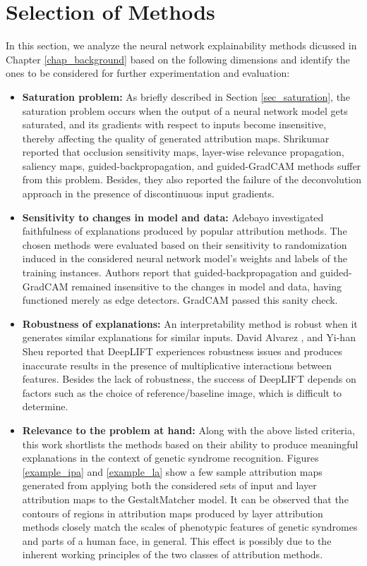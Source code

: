 \documentclass[../report.tex]{subfiles}
\begin{document}
    \section{Selection of Methods}\label{sec_method_selection}
    \raggedbottom
    \noindent
    In this section, we analyze the neural network explainability methods dicussed in Chapter \ref{chap_background} based on the following dimensions and identify the ones to be considered for further experimentation and evaluation:
    \begin{itemize}
    	\item \textbf{Saturation problem:} As briefly described in Section \ref{sec_saturation}, the  saturation problem occurs when the output of a neural network model gets saturated, and its gradients with respect to inputs become insensitive, thereby affecting the quality of generated attribution maps. Shrikumar \etal \cite{shrikumar2017learning} reported that occlusion sensitivity maps, layer-wise relevance propagation, saliency maps, guided-backpropagation, and guided-GradCAM methods suffer from this problem. Besides, they also reported the failure of the deconvolution approach in the presence of discontinuous input gradients.   
    	\item \textbf{Sensitivity to changes in model and data:} Adebayo \etal \cite{adebayo2018sanity} investigated faithfulness of explanations produced by popular attribution methods. The chosen methods were evaluated based on their sensitivity to randomization induced in the considered neural network model's weights and labels of the training instances. Authors report that guided-backpropagation and guided-GradCAM remained insensitive to the changes in model and data, having functioned merely as edge detectors. GradCAM passed this sanity check.
    	\item \textbf{Robustness of explanations:} An interpretability method is robust when it generates similar explanations for similar inputs. David Alvarez \etal \cite{alvarez2018robustness}, and Yi-han Sheu \cite{sheu2020illuminating} reported that DeepLIFT experiences robustness issues and produces inaccurate results in the presence of multiplicative interactions between features. Besides the lack of robustness, the success of DeepLIFT depends on factors such as the choice of reference/baseline image, which is difficult to determine. 
    	\item \textbf{Relevance to the problem at hand:} Along with the above listed criteria, this work shortlists the methods based on their ability to produce meaningful explanations in the context of genetic syndrome recognition. Figures \ref{example_ipa} and \ref{example_la}  show a few sample attribution maps generated from applying both the considered sets of input and layer attribution maps to the GestaltMatcher model. It can be observed that the contours of regions in attribution maps produced by layer attribution methods closely match the scales of phenotypic features of genetic syndromes and parts of a human face, in general. This effect is possibly due to the inherent working principles of the two classes of attribution methods.
    	

\end{itemize}
\end{document}
